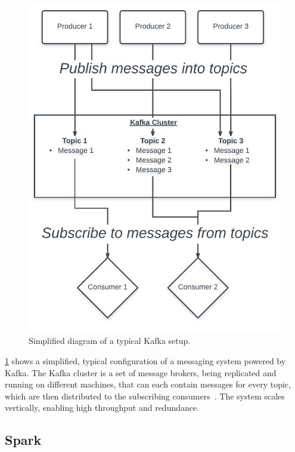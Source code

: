 \begin{figure}
    \centering
    \caption{Simplified diagram of a typical Kafka setup.}
    \label{fig:kafka}
    \includegraphics[width=\textwidth]{../figures/kafka.pdf}
\end{figure}

\ref{fig:kafka} shows a simplified, typical configuration of a messaging system powered by Kafka.
The Kafka cluster is a set of message brokers, being replicated and running on different machines, that can each contain messages for every topic,
which are then distributed to the subscribing consumers~\cite{Kreps2015}.
The system scales vertically, enabling high throughput and redundance.

\subsection{Spark}
\label{subsec:spark}

